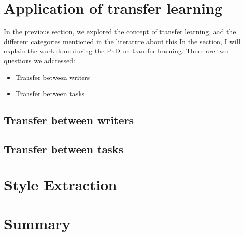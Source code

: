\section{Application of transfer learning}
\par In the previous section, we explored the concept of transfer learning, and the different categories mentioned in the literature about this
In the section, I will explain the work done during the PhD on transfer learning. There are two questions we addressed:
\begin{itemize}[noitemsep]
    \item Transfer between writers
    \item Transfer between tasks
\end{itemize}

\subsection{Transfer between writers}
\subsection{Transfer between tasks}

\section{Style Extraction}

\section{Summary}
